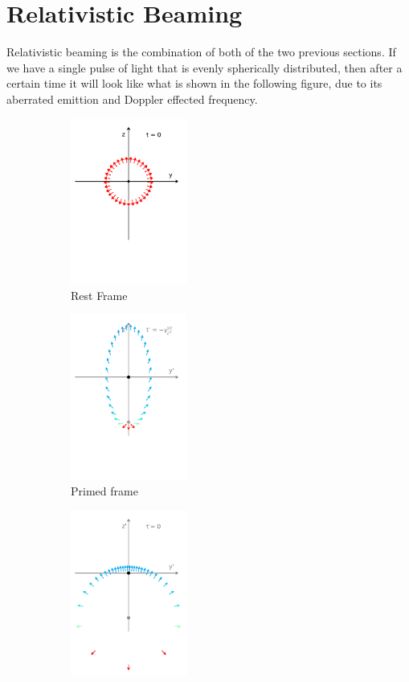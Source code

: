 \section{Relativistic Beaming} \label{sect: Relativistic Beaming}

Relativistic beaming is the combination of both of the two previous sections.
If we have a single pulse of light that is evenly spherically distributed, then after a certain time it will look like what is shown in the following figure, due to its aberrated emittion and Doppler effected frequency.

\begin{figure}[H]
	\begin{subfigure}{.32\textwidth}
		\centering
		\includegraphics[width = 3.8cm]{images/pdf/Rest_Pulse.pdf}
		\caption{Rest Frame \newline}
		\label{fig: Relativistic beaming 1}
	\end{subfigure}
	\begin{subfigure}{.32\textwidth}
		\centering
		\includegraphics[width = 3.8cm]{images/pdf/Prime_Pulse.pdf}
		\caption{Primed frame \newline}
		\label{fig: Relativistic beaming 2}
	\end{subfigure}
	\begin{subfigure}{.32\textwidth}
		\centering
		\includegraphics[width = 3.8cm]{images/pdf/Prime_Pulse_Simultaneous.pdf}

\end{subfigure}
\end{figure}
